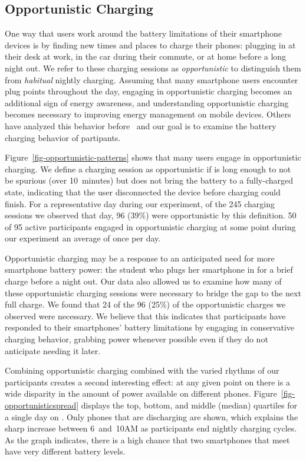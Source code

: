\subsection{Opportunistic Charging}
\label{subsec-opportunistic}

One way that users work around the battery limitations of their smartphone
devices is by finding new times and places to charge their phones: plugging
in at their desk at work, in the car during their commute, or at home before
a long night out. We refer to these charging sessions as
\textit{opportunistic} to distinguish them from \textit{habitual} nightly
charging. Assuming that many smartphone users encounter plug points
throughout the day, engaging in opportunistic charging becomes an additional
sign of energy awareness, and understanding opportunistic charging becomes
necessary to improving energy management on mobile devices. Others have analyzed
this behavior before~\cite{banerjee:ubicomp:2007, rahmati:mobilehci:2007} and
our goal is to examine the battery charging behavior of \PhoneLab{} partipants.

Figure~\ref{fig-opportunistic-patterns} shows that many users engage in
opportunistic charging. We define a charging session as opportunistic if is
long enough to not be spurious (over 10~minutes) but does not bring the
battery to a fully-charged state, indicating that the user disconnected the
device before charging could finish. For a representative day during our
experiment, of the 245 charging sessions we observed that day, 96 (39\%) were
opportunistic by this definition. 50 of 95 active participants engaged in
opportunistic charging at some point during our experiment an average of once
per day.

Opportunistic charging may be a response to an anticipated need for more
smartphone battery power: the student who plugs her smartphone in for a brief
charge before a night out. Our data also allowed us to examine how many of
these opportunistic charging sessions were necessary to bridge the gap to the
next full charge. We found that 24 of the 96 (25\%) of the opportunistic
charges we observed were necessary. We believe that this indicates that
participants have responded to their smartphones' battery limitations by
engaging in conservative charging behavior, grabbing power whenever possible
even if they do not anticipate needing it later.

Combining opportunistic charging combined with the varied rhythms of our
participants creates a second interesting effect: at any given point on
\PhoneLab{} there is a wide disparity in the amount of power available on
different phones. Figure~\ref{fig-opportunisticspread} displays the top,
bottom, and middle (median) quartiles for a single day on \PhoneLab{}. Only
phones that are discharging are shown, which explains the sharp increase
between 6~and~10AM as participants end nightly charging cycles.  As the graph
indicates, there is a high chance that two smartphones that meet have very
different battery levels.


